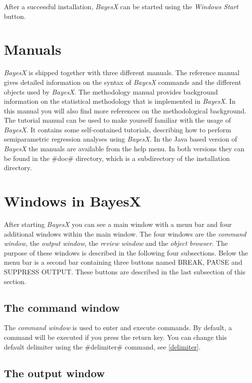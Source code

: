 After a successful installation, {\em BayesX} can be started using
the {\em Windows Start} button.

\section{Manuals}

{\em BayesX} is shipped together with three different manuals. The
reference manual gives detailed information on the syntax of {\em
BayesX} commands and the different objects used by {\em BayesX}. The
methodology manual provides background information on the
statistical methodology that is implemented in {\em BayesX}. In this
manual you will also find more references on the methodological
background. The tutorial manual can be used to make yourself
familiar with the usage of {\em BayesX}. It contains some
self-contained tutorials, describing how to perform semiparametric
regression analyses using {\em BayesX}. In the Java based version of
{\em BayesX} the manuals are available from the help menu. In both
versions they can be found in the #doc# directory, which is a
subdirectory of the installation directory.

\section{Windows in BayesX}

After starting {\em BayesX} you can see a main window with a menu
bar and four additional windows within the main window. The four
windows are the {\em command window}, the {\em output window}, the
{\em review window} and the {\em object browser}. The purpose of
these windows is described in the following four subsections.
Below the menu bar is a second bar containing three buttons named
BREAK, PAUSE and SUPPRESS OUTPUT. These buttons are described in
the last subsection of this section.

\subsection{The command window}

  The {\em command window}
is used to enter and execute commands. By default, a command will
be executed if you press the return key. You can change this
default delimiter using the #delimiter# command, see
\autoref{delimiter}.

\subsection{The output window}
 


